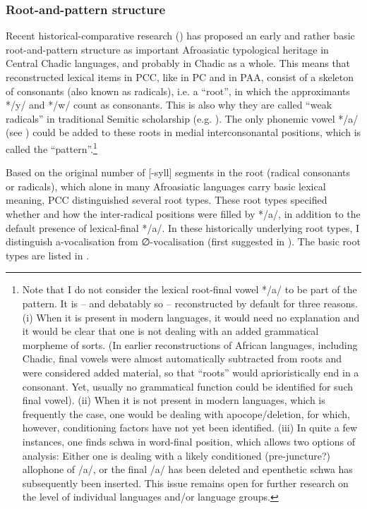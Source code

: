 \documentclass[output=paper]{langscibook}
\begin{document}
\subsubsection{Root-and-pattern structure}
\label{sec:Wolff:1.4.2}
Recent historical-comparative research (\citealt{Wolff2022a, Wolffinpressb}) has proposed an early and rather basic root-and-pattern structure as important Afroasiatic typological heritage in Central Chadic languages, and probably in Chadic as a whole. This means that reconstructed lexical items in PCC, like in PC and in PAA, consist of a skeleton of consonants (also known as radicals), i.e. a ``root'', in which the approximants */y/ and */w/ count as consonants. This is also why they are called ``weak radicals'' in traditional Semitic scholarship (e.g. \citet{Akesson2001}). The only phonemic vowel */a/ (see ) could be added to these roots in medial interconsonantal positions, which is called the ``pattern''.\footnote{Note that I do not consider the lexical root-final vowel */a/ to be part of the pattern. It is – and debatably so – reconstructed by default for three reasons. (i) When it is present in modern languages, it would need no explanation and it would be clear that one is not dealing with an added grammatical morpheme of sorts. (In earlier reconstructions of African languages, including Chadic, final vowels were almost automatically subtracted from roots and were considered added material, so that ``roots'' would aprioristically end in a consonant. Yet, usually no grammatical function could be identified for such final vowel). (ii) When it is not present in modern languages, which is frequently the case, one would be dealing with apocope/deletion, for which, however, conditioning factors have not yet been identified. (iii) In quite a few instances, one finds schwa in word-final position, which allows two options of analysis: Either one is dealing with a likely conditioned (pre-juncture?) allophone of /a/, or the final /a/ has been deleted and epenthetic schwa has subsequently been inserted. This issue remains open for further research on the level of individual languages and/or language groups.}

Based on the original number of [-syll] segments in the root (radical consonants or radicals), which alone in many Afroasiatic languages carry basic lexical meaning, PCC distinguished several root types. These root types specified whether and how the inter-radical positions were filled by */a/, in addition to the default presence of lexical-final */a/. In these historically underlying root types, I distinguish a-vocalisation from ∅-vocalisation (first suggested in \citealt{Wolff1977}). The basic root types are listed in .
\end{document}
